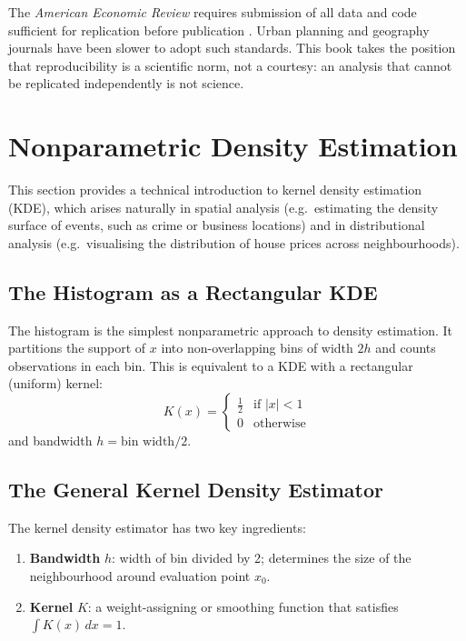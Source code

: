 The \emph{American Economic Review} requires submission of all data and code
sufficient for replication before publication \citep{AER2024}. Urban
planning and geography journals have been slower to adopt such standards.
This book takes the position that reproducibility is a scientific norm, not
a courtesy: an analysis that cannot be replicated independently is not
science.


\section{Nonparametric Density Estimation}
\label{sec_KDE}

This section provides a technical introduction to kernel density estimation
(KDE), which arises naturally in spatial analysis (e.g.\ estimating the
density surface of events, such as crime or business locations) and in
distributional analysis (e.g.\ visualising the distribution of house prices
across neighbourhoods).

\subsection{The Histogram as a Rectangular KDE}

The histogram is the simplest nonparametric approach to density estimation.
It partitions the support of $x$ into non-overlapping bins of width $2h$
and counts observations in each bin. This is equivalent to a KDE with a
rectangular (uniform) kernel:
\begin{equation}
  K(x) = \begin{cases}
    \tfrac{1}{2} & \text{if } |x| < 1 \\
    0            & \text{otherwise}
  \end{cases}
\end{equation}
and bandwidth $h = \text{bin width}/2$.

\subsection{The General Kernel Density Estimator}

The kernel density estimator has two key ingredients:
\begin{enumerate}[label=(\roman*)]
  \item \textbf{Bandwidth} $h$: width of bin divided by 2; determines the
    size of the neighbourhood around evaluation point $x_0$.
  \item \textbf{Kernel} $K$: a weight-assigning or smoothing function
    that satisfies $\int K(x)\,dx = 1$.
\end{enumerate}

